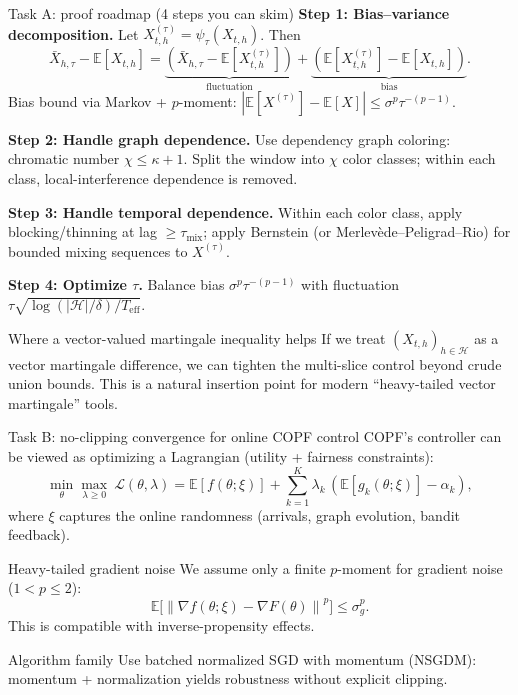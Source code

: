 \documentclass[aspectratio=169,11pt]{beamer}
\newcommand{\1}{\mathbbm{1}}
\newcommand{\E}{\mathbb{E}}
\newcommand{\cH}{\mathcal{H}}
\newcommand{\norm}[1]{\left\lVert#1\right\rVert}
\begin{document}
\begin{frame}{Task A: proof roadmap (4 steps you can skim)}
\small
\textbf{Step 1: Bias--variance decomposition.}
Let $X_{t,h}^{(\tau)}=\psi_\tau(X_{t,h})$. Then
\[
\bar X_{h,\tau}-\E[X_{t,h}] = \underbrace{(\bar X_{h,\tau}-\E[X_{t,h}^{(\tau)}])}_{\text{fluctuation}}
+\underbrace{(\E[X_{t,h}^{(\tau)}]-\E[X_{t,h}])}_{\text{bias}}.
\]
Bias bound via Markov + $p$-moment: $|\E[X^{(\tau)}]-\E[X]|\le \sigma^p\tau^{-(p-1)}$.

\vspace{0.4em}
\textbf{Step 2: Handle graph dependence.}
Use dependency graph coloring: chromatic number $\chi\le \kappa+1$.
Split the window into $\chi$ color classes; within each class, local-interference dependence is removed.

\vspace{0.4em}
\textbf{Step 3: Handle temporal dependence.}
Within each color class, apply blocking/thinning at lag $\ge \tau_{\mathrm{mix}}$;
apply Bernstein (or Merlev\`ede--Peligrad--Rio) for bounded mixing sequences to $X^{(\tau)}$.

\vspace{0.4em}
\textbf{Step 4: Optimize $\tau$.}
Balance bias $\sigma^p\tau^{-(p-1)}$ with fluctuation $\tau\sqrt{\log(|\cH|/\delta)/T_{\mathrm{eff}}}$.

\begin{block}{Where a vector-valued martingale inequality helps}
\small
If we treat $(X_{t,h})_{h\in\cH}$ as a vector martingale difference,
we can tighten the multi-slice control beyond crude union bounds.
This is a natural insertion point for modern ``heavy-tailed vector martingale'' tools.
\end{block}
\end{frame}

\begin{frame}{Task B: no-clipping convergence for online COPF control}
\small
COPF's controller can be viewed as optimizing a Lagrangian (utility + fairness constraints):
\[
\min_{\theta}\max_{\lambda\ge 0}\ \mathcal{L}(\theta,\lambda)
= \E[f(\theta;\xi)] + \sum_{k=1}^K \lambda_k\, (\E[g_k(\theta;\xi)]-\alpha_k),
\]
where $\xi$ captures the online randomness (arrivals, graph evolution, bandit feedback).

\begin{block}{Heavy-tailed gradient noise}
\small
We assume only a finite $p$-moment for gradient noise ($1<p\le 2$):
\[
\E\big[\norm{\nabla f(\theta;\xi)-\nabla F(\theta)}^p\big]\le \sigma_g^p.
\]
This is compatible with inverse-propensity effects.
\end{block}

\begin{block}{Algorithm family}
\small
Use batched normalized SGD with momentum (NSGDM): momentum + normalization yields robustness
without explicit clipping.
\end{block}
\end{frame}
\end{document}

